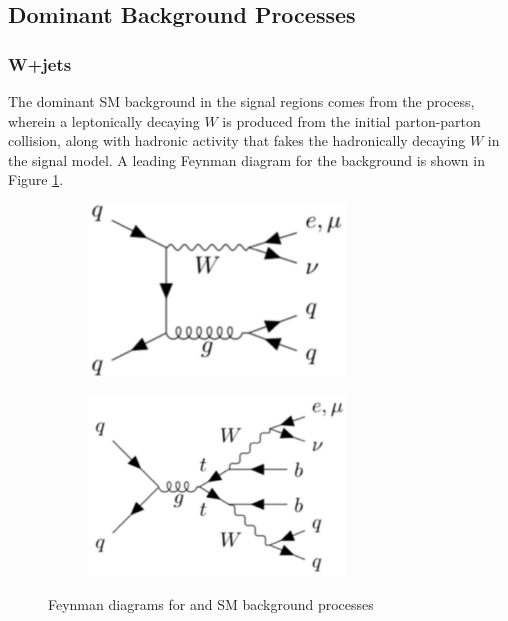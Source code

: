 \subsection{Dominant Background Processes}
\label{sec:dominant_bkgs}

\subsubsection{W+jets}
\label{sec:wjets_description}

The dominant SM background in the signal regions comes from the \wjets process, wherein a leptonically decaying \(W\) is produced from the initial parton-parton collision, along with hadronic activity that fakes the hadronically decaying \(W\) in the signal model. A leading Feynman diagram for the \wjets background is shown in Figure \ref{fig:Wjets_Feynman}.

\begin{figure}[h]
  \centering
     \begin{subfigure}{0.49\textwidth}
     \includegraphics[width = 0.75\textwidth]{Figures/4/Fey_Wjets.pdf}
    \caption{\wjets}
    \label{fig:Wjets_Feynman}
     \end{subfigure}
    \begin{subfigure}{0.49\textwidth}
     \includegraphics[width = 0.75\textwidth]{Figures/4/Fey_ttbar.pdf}
     \caption{\ttbar}
     \label{fig:ttbar_Feynman}
     \end{subfigure}
     \caption{Feynman diagrams for \wjets and \ttbar SM background processes}
     \label{fig:Feynman_bkgs}
  \end{figure}
  
